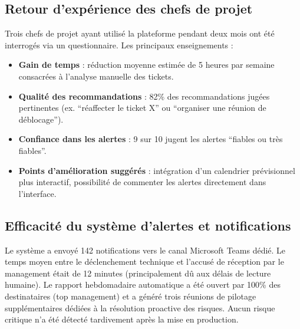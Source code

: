 \subsection{Retour d’expérience des chefs de projet}
Trois chefs de projet ayant utilisé la plateforme pendant deux mois ont été interrogés via un questionnaire. Les principaux enseignements :
\begin{itemize}
    \renewcommand{\labelitemi}{—}
    \item \textbf{Gain de temps} : réduction moyenne estimée de 5 heures par semaine consacrées à l’analyse manuelle des tickets.
    \item \textbf{Qualité des recommandations} : 82\% des recommandations jugées pertinentes (ex. “réaffecter le ticket X” ou “organiser une réunion de déblocage”).
    \item \textbf{Confiance dans les alertes} : 9 sur 10 jugent les alertes “fiables ou très fiables”.
    \item \textbf{Points d’amélioration suggérés} : intégration d’un calendrier prévisionnel plus interactif, possibilité de commenter les alertes directement dans l’interface.
\end{itemize}

\subsection{Efficacité du système d’alertes et notifications}
Le système a envoyé 142 notifications vers le canal Microsoft Teams dédié. Le temps moyen entre le déclenchement technique et l’accusé de réception par le management était de 12 minutes (principalement dû aux délais de lecture humaine). Le rapport hebdomadaire automatique a été ouvert par 100\% des destinataires (top management) et a généré trois réunions de pilotage supplémentaires dédiées à la résolution proactive des risques. Aucun risque critique n’a été détecté tardivement après la mise en production.

